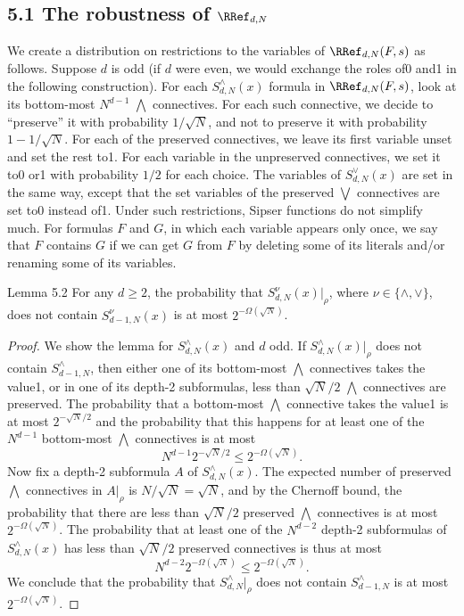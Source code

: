 \subsection*{5.1 The robustness of $\RRef_{d,N}$}
We create a distribution on restrictions to the variables of $\RRef_{d,N}(F,s)$ as follows. Suppose $d$ is odd (if $d$ were even, we would exchange the roles of0 and1 in the following construction). For each $S_{d,N}^{\wedge}(x)$ formula in $\RRef_{d,N}(F,s)$, look at its bottom-most $N^{d-1}$ $\bigwedge$ connectives. For each such connective, we decide to ``preserve'' it with probability $1/\sqrt N$, and not to preserve it with probability $1-1/\sqrt N$. For each of the preserved connectives, we leave its first variable unset and set the rest to1. For each variable in the unpreserved connectives, we set it to0 or1 with probability $1/2$ for each choice. The variables of $S_{d,N}^{\vee}(x)$ are set in the same way, except that the set variables of the preserved $\bigvee$ connectives are set to0 instead of1.
Under such restrictions, Sipser functions do not simplify much. For formulas $F$ and $G$, in which each variable appears only once, we say that $F$ contains $G$ if we can get $G$ from $F$ by deleting some of its literals and/or renaming some of its variables.
\begin{originalresult}{Lemma 5.2}
For any $d\ge2$, the probability that $S_{d,N}^{\nu}(x)|_\rho$, where $\nu\in\{\wedge,\vee\}$, does not contain $S_{d-1,N}^{\nu}(x)$ is at most $2^{-\Omega(\sqrt N)}$.
\end{originalresult}
\begin{proof}
We show the lemma for $S_{d,N}^{\wedge}(x)$ and $d$ odd. If $S_{d,N}^{\wedge}(x)|_\rho$ does not contain $S_{d-1,N}^{\wedge}$, then either one of its bottom-most $\bigwedge$ connectives takes the value1, or in one of its depth-2 subformulas, less than $\sqrt N/2$ $\bigwedge$ connectives are preserved. The probability that a bottom-most $\bigwedge$ connective takes the value1 is at most $2^{-\sqrt N/2}$ and the probability that this happens for at least one of the $N^{d-1}$ bottom-most $\bigwedge$ connectives is at most
\[N^{d-1}2^{-\sqrt N/2}\le2^{-\Omega(\sqrt N)}.\]
Now fix a depth-2 subformula $A$ of $S_{d,N}^{\wedge}(x)$. The expected number of preserved $\bigwedge$ connectives in $A|_\rho$ is $N/\sqrt N=\sqrt N$, and by the Chernoff bound, the probability that there are less than $\sqrt N/2$ preserved $\bigwedge$ connectives is at most $2^{-\Omega(\sqrt N)}$. The probability that at least one of the $N^{d-2}$ depth-2 subformulas of $S_{d,N}^{\wedge}(x)$ has less than $\sqrt N/2$ preserved connectives is thus at most
\[N^{d-2}2^{-\Omega(\sqrt N)}\le2^{-\Omega(\sqrt N)}.\]
We conclude that the probability that $S_{d,N}^{\wedge}|_\rho$ does not contain $S_{d-1,N}^{\wedge}$ is at most $2^{-\Omega(\sqrt N)}$.
\end{proof}
